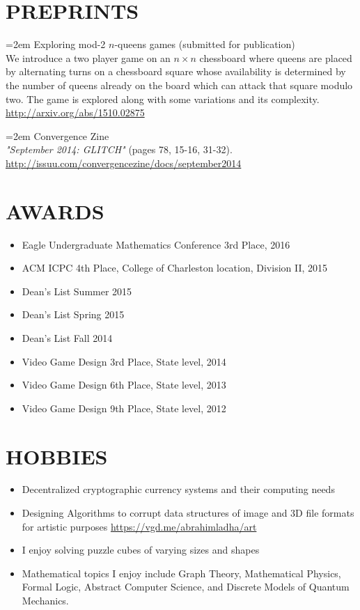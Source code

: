 \documentclass[11pt]{article} %
\begin{document}
\section*{PREPRINTS}
\hangindent=2em
Exploring mod-2 $n$-queens games (submitted for publication)\\
We introduce a two player game on an $n \times n$ chessboard where queens are placed by alternating turns on a chessboard square whose availability is determined by the number of queens already on the board which can attack that square modulo two. The game is explored along with some variations and its complexity.
\url{http://arxiv.org/abs/1510.02875}

\hangindent=2em
Convergence Zine\\
\emph{"September 2014: GLITCH"} ​(pages 7­8, 15-­16, 31-­32). \url{http://issuu.com/convergencezine/docs/september2014}
\\
\section*{AWARDS}
\begin{itemize}
  \setlength{\itemsep}{1pt}
  \setlength{\parskip}{0pt}
  \setlength{\parsep}{0pt}
\item Eagle Undergraduate Mathematics Conference 3rd Place, 2016
\item ACM ICPC 4th Place, College of Charleston location, Division II, 2015
\item Dean's List Summer 2015
\item Dean's List Spring 2015
\item Dean's List Fall 2014
\item Video Game Design 3rd Place, State level, 2014
\item Video Game Design 6th Place, State level, 2013
\item Video Game Design 9th Place, State level, 2012
\end{itemize}
\section*{HOBBIES}
\begin{itemize}
  \setlength{\itemsep}{1pt}
  \setlength{\parskip}{0pt}
  \setlength{\parsep}{0pt}
\item Decentralized cryptographic currency systems and their computing needs
\item Designing Algorithms to corrupt data structures of image and 3D file formats for artistic purposes \url{https://vgd.me/abrahimladha/art}
\item I enjoy solving puzzle cubes of varying sizes and shapes
\item Mathematical topics I enjoy include Graph Theory, Mathematical Physics, Formal Logic, Abstract Computer Science, and Discrete Models of Quantum Mechanics.
\end{itemize}
\end{document}
